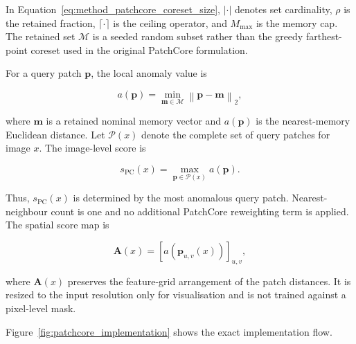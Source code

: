 \documentclass[fleqn,12pt]{olplainarticle}
\begin{document}
In Equation~\ref{eq:method_patchcore_coreset_size},
$|\cdot|$ denotes set cardinality, $\rho$ is the retained fraction,
$\lceil\cdot\rceil$ is the ceiling operator, and $M_{\max}$ is the memory cap.
The retained set $\mathcal{M}$ is a seeded random subset rather than the
greedy farthest-point coreset used in the original PatchCore formulation.

For a query patch $\mathbf{p}$, the local anomaly value is

\begin{equation}
    a(\mathbf{p})
    =
    \min_{\mathbf{m}\in\mathcal{M}}
    \left\|
        \mathbf{p}-\mathbf{m}
    \right\|_2,
    \label{eq:method_patch_anomaly_score}
\end{equation}

where $\mathbf{m}$ is a retained nominal memory vector and
$a(\mathbf{p})$ is the nearest-memory Euclidean distance. Let
$\mathcal{P}(x)$ denote the complete set of query patches for image $x$. The
image-level score is

\begin{equation}
    s_{\mathrm{PC}}(x)
    =
    \max_{\mathbf{p}\in\mathcal{P}(x)}
    a(\mathbf{p}).
    \label{eq:method_patchcore_image_score}
\end{equation}

Thus, $s_{\mathrm{PC}}(x)$ is determined by the most anomalous query patch.
Nearest-neighbour count is one and no additional PatchCore reweighting term is
applied. The spatial score map is

\begin{equation}
    \mathbf{A}(x)
    =
    \left[
        a\!\left(
            \mathbf{p}_{u,v}(x)
        \right)
    \right]_{u,v},
    \label{eq:method_patchcore_map}
\end{equation}

where $\mathbf{A}(x)$ preserves the feature-grid arrangement of the patch
distances. It is resized to the input resolution only for visualisation and is
not trained against a pixel-level mask.

Figure~\ref{fig:patchcore_implementation} shows the exact implementation flow.
\end{document}
